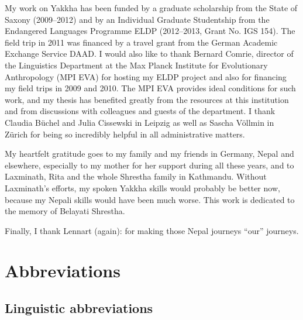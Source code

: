 My work on Yakkha has been  funded by a graduate scholarship from the State of Saxony (2009–2012) and by an Individual Graduate Studentship from the Endangered Languages Programme ELDP (2012–2013, Grant No. IGS 154). The field trip in 2011 was financed by a travel grant from the German Academic Exchange Service DAAD. I would also like to thank Bernard Comrie, director of the Linguistics Department at the Max Planck Institute for Evolutionary Anthropology (MPI EVA)  for hosting my ELDP project and also for financing my field trips in 2009 and 2010. The MPI EVA provides ideal conditions for such work, and my thesis has benefited greatly from the resources at this institution and from discussions with colleagues and guests of the department. I thank Claudia Büchel and Julia Cissewski in Leipzig as well as Sascha Völlmin in Zürich for being so incredibly helpful in all administrative matters. 

My heartfelt gratitude goes to my family and my friends in Germany, Nepal and elsewhere, especially to my mother for her support during all these years, and to Laxminath, Rita and the whole Shrestha family in Kathmandu. Without Laxminath's efforts, my spoken Yakkha skills would probably be better now, because my Nepali skills would have been much worse. This work is dedicated to the memory of Belayati Shrestha.  

Finally, I thank Lennart (again): for making those Nepal journeys  “our” journeys.






\chapter*{Abbreviations}\label{abbreviations}

\section*{Linguistic abbreviations}

